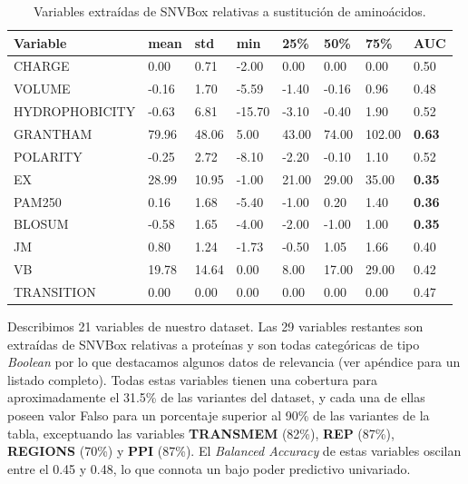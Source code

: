 \begin{table}[H]
\centering
\begin{tabular}{|l|l|l|l|l|l|l|l|}
\hline
Variable & mean   & std    & min    & 25\%  & 50\%   & 75\%   & AUC    \\ \hline
CHARGE            & 0.00  & 0.71   & -2.00  & 0.00  & 0.00   & 0.00   & 0.50   \\ \hline
VOLUME            & -0.16  & 1.70   & -5.59  & -1.40 & -0.16  & 0.96   & 0.48   \\ \hline
HYDROPHOBICITY    & -0.63  & 6.81   & -15.70 & -3.10 & -0.40  & 1.90   & 0.52  \\ \hline
GRANTHAM          & 79.96  & 48.06  & 5.00   & 43.00 & 74.00  & 102.00 & \textbf{0.63} \\ \hline
POLARITY          & -0.25  & 2.72   & -8.10  & -2.20 & -0.10  & 1.10   & 0.52   \\ \hline
EX                & 28.99  & 10.95  & -1.00  & 21.00 & 29.00  & 35.00  & \textbf{0.35}  \\ \hline
PAM250            & 0.16   & 1.68   & -5.40  & -1.00 & 0.20   & 1.40   & \textbf{0.36}   \\ \hline
BLOSUM            & -0.58  & 1.65   & -4.00  & -2.00 & -1.00  & 1.00   & \textbf{0.35}   \\ \hline
JM                & 0.80   & 1.24   & -1.73  & -0.50 & 1.05   & 1.66   & 0.40   \\ \hline
VB                & 19.78  & 14.64  & 0.00   & 8.00  & 17.00  & 29.00  & 0.42  \\ \hline
TRANSITION        & 0.00   & 0.00   & 0.00   & 0.00  & 0.00   & 0.00   & 0.47   \\ \hline
\end{tabular}
\caption{Variables extraídas de SNVBox relativas a sustitución de aminoácidos.}
\label{tab:snvbox_amino}

\end{table}

Describimos 21 variables de nuestro dataset. Las 29 variables restantes son extraídas de SNVBox relativas a proteínas y son todas categóricas de tipo \textit{Boolean} por lo que destacamos algunos datos de relevancia (ver apéndice para un listado completo). Todas estas variables tienen una cobertura para aproximadamente el 31.5\% de las variantes del dataset, y cada una de ellas poseen valor Falso para un porcentaje superior al 90\% de las variantes de la tabla, exceptuando las variables \textbf{TRANSMEM} (82\%), \textbf{REP} (87\%), \textbf{REGIONS} (70\%) y \textbf{PPI} (87\%). El \textit{Balanced Accuracy} de estas variables oscilan entre el 0.45 y 0.48, lo que connota un bajo poder predictivo univariado.



